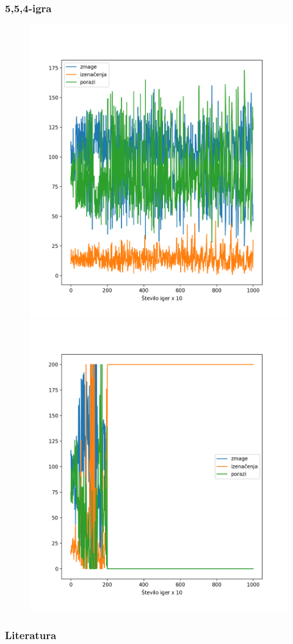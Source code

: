 \documentclass{beamer}    %
\begin{document}
\begin{frame}
    \frametitle{5,5,4-igra}
    \begin{figure}
        \includegraphics[scale=0.29]{slike/554-agent.png}
        \includegraphics[scale=0.29]{slike/554g-agent.png}
    \end{figure}
\end{frame}


\begin{frame}[t, allowframebreaks]
    \frametitle{Literatura}
    \nocite{*}
    
    
\end{frame}
\end{document}
